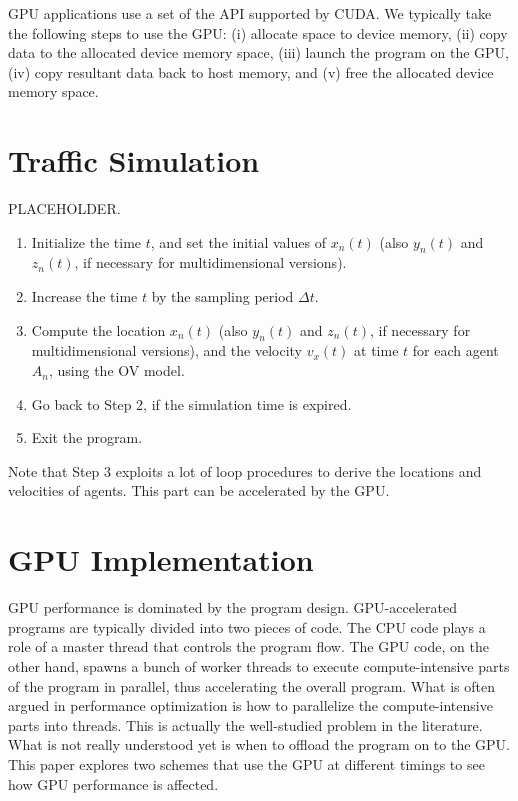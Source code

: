\documentclass[times, 10pt, twocolumn]{article}
\begin{document}
GPU applications use a set of the API supported by CUDA.
We typically take the following steps to use the GPU: (i) allocate space
to device memory, (ii) copy data to the allocated device memory space,
(iii) launch the program on the GPU, (iv) copy resultant data back to
host memory, and (v) free the allocated device memory space. 


\section{Traffic Simulation}
\label{sec:traffic_simulation}

PLACEHOLDER.

\begin{enumerate}
 \item Initialize the time $t$, and set the initial values of $x_n(t)$
       (also $y_n(t)$ and $z_n(t)$, if necessary for multidimensional
       versions).
 \item Increase the time $t$ by the sampling period $\Delta t$.
 \item Compute the location $x_n(t)$ (also $y_n(t)$ and $z_n(t)$, if
       necessary for multidimensional versions), and the velocity
       $v_x(t)$ at time $t$ for each agent $A_n$, using the OV model.
 \item Go back to Step 2, if the simulation time is expired.
 \item Exit the program.
\end{enumerate}

Note that Step 3 exploits a lot of loop procedures to derive the
locations and velocities of agents.
This part can be accelerated by the GPU.

\section{GPU Implementation}
\label{sec:gpu_implementations}

GPU performance is dominated by the program design.
GPU-accelerated programs are typically divided into two pieces of code.
The CPU code plays a role of a master thread that controls the program
flow.
The GPU code, on the other hand, spawns a bunch of worker threads to
execute compute-intensive parts of the program in parallel, thus
accelerating the overall program.
What is often argued in performance optimization is how to parallelize
the compute-intensive parts into threads.
This is actually the well-studied problem in the literature.
What is not really understood yet is when to offload the program on to
the GPU.
This paper explores two schemes that use the GPU at different timings to
see how GPU performance is affected.
\end{document}
